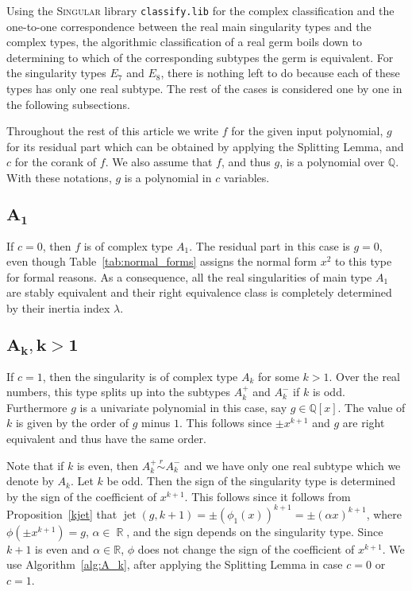 \documentclass[noend]{amsproc}
\theoremstyle{definition}
\newcommand{\classify}{\texttt{classify.lib}}
\newcommand{\requiv}{\ensuremath{\mathrel{\overset{r}{\sim}}}}
\DeclareMathOperator{\jet}{jet}
\DeclareMathOperator{\R}{\mathbb{R}}
\begin{document}
Using the \textsc{Singular} library \classify{} \citep{classify} for the
complex classification and the one-to-one correspondence between the real main
singularity types and the complex types, the algorithmic classification of a
real germ boils down to determining to which of the corresponding subtypes the
germ is equivalent. For the singularity types $E_7$ and $E_8$, there is nothing
left to do because each of these types has only one real subtype. The rest of
the cases is considered one by one in the following subsections.

Throughout the rest of this article we write $f$ for the given input
polynomial, $g$ for its residual part which can be obtained by applying the
Splitting Lemma, and $c$ for the corank of $f$. We also assume that $f$, and
thus $g$, is a polynomial over $\mathbb Q$. With these notations, $g$ is a
polynomial in $c$ variables.

\subsection{$\boldsymbol{A_1}$}
If $c = 0$, then $f$ is of complex type $A_1$. The residual part in this case
is $g = 0$, even though Table~\ref{tab:normal_forms} assigns the normal form
$x^2$ to this type for formal reasons. As a consequence, all the real
singularities of main type $A_1$ are stably equivalent and their right
equivalence class is completely determined by their inertia index $\lambda$.


\subsection{$\boldsymbol{A_k, k > 1}$}
If $c = 1$, then the singularity is of complex type $A_k$ for some $k > 1$.
Over the real numbers, this type splits up into the subtypes $A_k^+$ and
$A_k^-$ if $k$ is odd. Furthermore $g$ is a univariate polynomial in this case,
say $g\in\mathbb Q[x]$. The value of $k$ is given by the order of $g$ minus
$1$. This follows since $\pm x^{k+1}$ and $g$ are right equivalent and thus
have the same order.

Note that if $k$ is even, then $A_k^+ \requiv A_k^-$ and we have only one real
subtype which we denote by $A_k$. Let $k$ be odd. Then the sign of the
singularity type is determined by the sign of the coefficient of $x^{k+1}$.
This follows since it follows from Proposition~\ref{kjet} that
$\jet(g, k+1) = \pm(\phi_1(x))^{k+1} = \pm(\alpha x)^{k+1}$, where
$\phi(\pm x^{k+1}) = g$, $\alpha \in \R$, and the sign depends on the
singularity type. Since $k+1$ is even and $\alpha \in \mathbb R$, $\phi$ does
not change the sign of the coefficient of $x^{k+1}$. We use
Algorithm~\ref{alg:A_k}, after applying the Splitting Lemma in case $c = 0$ or
$c = 1$.
\end{document}

